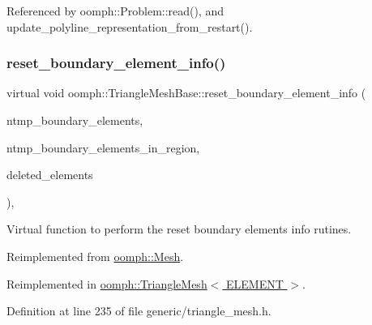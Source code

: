 Referenced by oomph\+::\+Problem\+::read(), and update\+\_\+polyline\+\_\+representation\+\_\+from\+\_\+restart().

\mbox{\label{classoomph_1_1TriangleMeshBase_a87ca1b2f78d61547def3245a5201689e}} 
\subsubsection{\texorpdfstring{reset\+\_\+boundary\+\_\+element\+\_\+info()}{reset\_boundary\_element\_info()}}
{\footnotesize\ttfamily virtual void oomph\+::\+Triangle\+Mesh\+Base\+::reset\+\_\+boundary\+\_\+element\+\_\+info (\begin{DoxyParamCaption}\item[{\hyperlink{classoomph_1_1Vector}{Vector}$<$ unsigned $>$ \&}]{ntmp\+\_\+boundary\+\_\+elements,  }\item[{\hyperlink{classoomph_1_1Vector}{Vector}$<$ \hyperlink{classoomph_1_1Vector}{Vector}$<$ unsigned $>$ $>$ \&}]{ntmp\+\_\+boundary\+\_\+elements\+\_\+in\+\_\+region,  }\item[{\hyperlink{classoomph_1_1Vector}{Vector}$<$ \hyperlink{classoomph_1_1FiniteElement}{Finite\+Element} $\ast$$>$ \&}]{deleted\+\_\+elements }\end{DoxyParamCaption})\hspace{0.3cm}{\ttfamily [inline]}, {\ttfamily [virtual]}}



Virtual function to perform the reset boundary elements info rutines. 



Reimplemented from \hyperlink{classoomph_1_1Mesh_af5495baffd4b886b65a53a0ad67bf0df}{oomph\+::\+Mesh}.



Reimplemented in \hyperlink{classoomph_1_1TriangleMesh_a2ae8220e71309b0fb2b53194c6383f95}{oomph\+::\+Triangle\+Mesh$<$ E\+L\+E\+M\+E\+N\+T $>$}.



Definition at line 235 of file generic/triangle\+\_\+mesh.\+h.

\mbox{\label{classoomph_1_1TriangleMeshBase_aa78fe0d750c842df53e1fa2237205e51}} 
